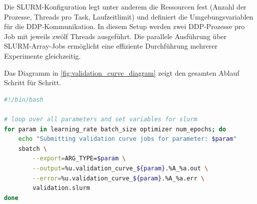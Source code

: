 \documentclass{article}
\begin{document}
Die SLURM-Konfiguration legt unter anderem die Ressourcen fest (Anzahl der Prozesse, Threads pro Task, Laufzeitlimit) und 
definiert die Umgebungsvariablen für die DDP-Kommunikation. In diesem Setup werden zwei DDP-Prozesse pro Job mit jeweils 
zwölf Threads ausgeführt. Die parallele Ausführung über SLURM-Array-Jobs ermöglicht eine effiziente Durchführung mehrerer Experimente gleichzeitig.

Das Diagramm in \ref{fig:validation_curve_diagram} zeigt den gesamten Ablauf Schritt für Schritt.


\begin{lstlisting}[language=bash, caption={Einreichung der Validation Curve Jobs über SLURM}, label={lst:bash_run}]
#!/bin/bash

# loop over all parameters and set variables for slurm
for param in learning_rate batch_size optimizer num_epochs; do
    echo "Submitting validation curve jobs for parameter: $param"
    sbatch \
        --export=ARG_TYPE=$param \
        --output=%u.validation_curve_${param}.%A_%a.out \
        --error=%u.validation_curve_${param}.%A_%a.err \
        validation.slurm
done
\end{lstlisting}
\end{document}
